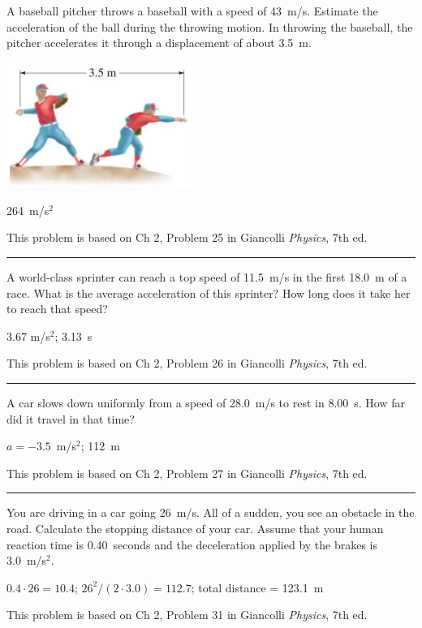 \documentclass[12pt]{exam}
\begin{document}
\def\mystrut{\protect\rule[-2.2ex]{0ex}{2.2ex}} 
\qformat{ \textbf{Task \#\thequestion}
  \ifthenelse{\equal{\thequestion}{\thequestiontitle}}
    {}
    {: \emph{\thequestiontitle}}
  \mystrut  \hfill}
\begin{questions}

  \Large

  \question 
    A baseball pitcher throws a baseball with a speed of 43~m/s.  Estimate the acceleration of the ball during the throwing motion.  In throwing the baseball, the pitcher accelerates it through a displacement of about 3.5~m.

    \includegraphics[width=6cm]{baseball.png}

    \begin{solution}
      264~m/s$^2$
    \end{solution}
    
    {\tiny This problem is based on Ch 2, Problem 25 in Giancolli \emph{Physics}, 7th ed.}
    \vs\hrule\vs
  \question
    A world-class sprinter can reach a top speed of 11.5~m/s in the first 18.0~m of a race.  What is the average acceleration of this sprinter?  How long does it take her to reach that speed?

    \begin{solution}
      3.67 m/s$^2$; 3.13~s
    \end{solution}

    {\tiny This problem is based on Ch 2, Problem 26 in Giancolli \emph{Physics}, 7th ed.}
    \vs\hrule\vs
  \question
    A car slows down uniformly from a speed of 28.0~m/s to rest in 8.00~s.  How far did it travel in that time?

    \begin{solution}
      $a=-3.5$~m/s$^2$; 112~m
    \end{solution}
    
    {\tiny This problem is based on Ch 2, Problem 27 in Giancolli \emph{Physics}, 7th ed.}
    \vs\hrule\vs
  \question
    You are driving in a car going 26~m/s.  All of a sudden, you see an obstacle in the road.  Calculate the stopping distance of your car.  Assume that your human reaction time is 0.40~seconds and the deceleration applied by the brakes is 3.0~m/s$^2$.

    \begin{solution}
      $0.4 \cdot 26 = 10.4$; $26^2/(2\cdot 3.0) = 112.7$; total distance = 123.1~m
    \end{solution}
    
    {\tiny This problem is based on Ch 2, Problem 31 in Giancolli \emph{Physics}, 7th ed.}
 \end{questions}
\end{document}
